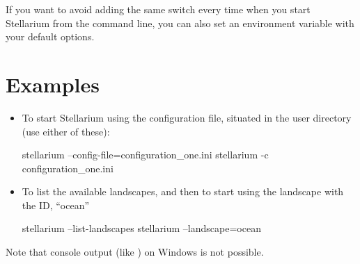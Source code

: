 \noindent {} If you want to avoid adding the same
switch every time when you start Stellarium from the command line, you
can also set an environment variable  with your
default options. 

\section{Examples}
\label{sec:CommandLineOptions:Examples}

\begin{itemize}
\item To start Stellarium using the configuration file,
   situated in the user directory (use either of
  these):

\begin{commands}
stellarium --config-file=configuration_one.ini
stellarium -c configuration_one.ini
\end{commands}

\item To list the available landscapes, and then to start using the
  landscape with the ID, ``ocean''
\begin{commands}
stellarium --list-landscapes 
stellarium --landscape=ocean
\end{commands}
\end{itemize}

\noindent Note that console output (like ) on Windows is not possible. 


